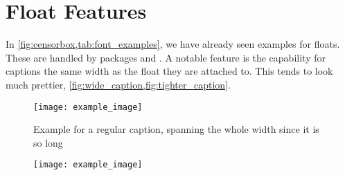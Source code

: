 \chapter{Float Features}
In \cref{fig:censorbox,tab:font_examples}, we have already seen examples for floats.
These are handled by packages  and .
A notable feature is the capability for captions the same width as the float they are attached to.
This tends to look much prettier,  \cref{fig:wide_caption,fig:tighter_caption}.
\begin{figure}
\texttt{[image: example\_image]}%
\caption{Example for a regular caption, spanning the whole width since it is so long}%
\label{fig:wide_caption}%
\end{figure}
\begin{figure}
%
{%
	\texttt{[image: example\_image]}%
}%
\end{figure}
